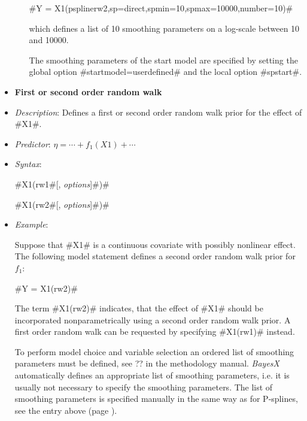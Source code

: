 \begin{itemize}
\begin{itemize}
#Y = X1(psplinerw2,sp=direct,spmin=10,spmax=10000,number=10)#

which defines a list of 10 smoothing parameters on a log-scale between 10 and 10000.

The smoothing parameters of the start model are specified by setting the global option #startmodel=userdefined# and the local option #spstart#.





\end{itemize}
\item[]{\bf\sffamily First or second order random walk}

\item[] {\em Description}: Defines a first or second order random walk prior for the effect of #X1#.
\item[] {\em Predictor}: $\eta = \cdots + f_1(X1) + \cdots $
\item[] {\em Syntax}:

#X1(rw1#[, {\em options}]#)#

#X1(rw2#[, {\em options}]#)#
\item[] {\em Example}:

Suppose that #X1# is a continuous covariate with possibly
nonlinear effect. The following model statement defines a second
order random walk prior for $f_1$:

#Y = X1(rw2)#

The term #X1(rw2)# indicates, that the effect of
#X1# should be incorporated nonparametrically using a second order
random walk prior. A first order random walk can be requested by
specifying #X1(rw1)# instead.

To perform model choice and variable selection an ordered list of smoothing parameters must be defined, see ??
in the methodology manual. {\em BayesX} automatically defines an appropriate list of smoothing parameters, i.e. it
is usually not necessary to  specify the smoothing parameters.
The list of smoothing parameters is specified manually in the same way as for P-splines,
see the entry above (page \pageref{psplines_stepwise}).

%
%
%
%
%
%



\end{itemize}
